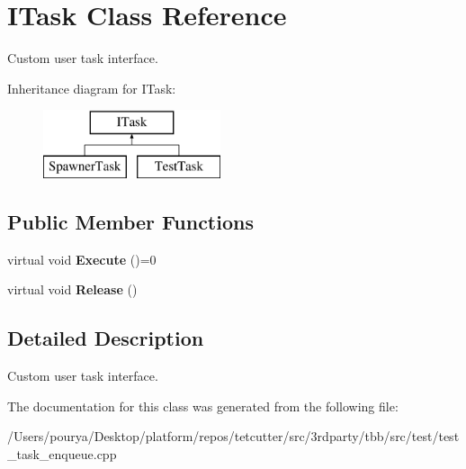 \hypertarget{classITask}{}\section{I\+Task Class Reference}
\label{classITask}


Custom user task interface.  


Inheritance diagram for I\+Task\+:\begin{figure}[H]
\begin{center}
\leavevmode
\includegraphics[height=2.000000cm]{classITask}
\end{center}
\end{figure}
\subsection*{Public Member Functions}
\begin{DoxyCompactItemize}
\item 
\hypertarget{classITask_acfeb6e5e2b09c96904e855215547afc4}{}virtual void {\bfseries Execute} ()=0\label{classITask_acfeb6e5e2b09c96904e855215547afc4}

\item 
\hypertarget{classITask_a623cbf8769786c67b5003c2a869abb0a}{}virtual void {\bfseries Release} ()\label{classITask_a623cbf8769786c67b5003c2a869abb0a}

\end{DoxyCompactItemize}


\subsection{Detailed Description}
Custom user task interface. 

The documentation for this class was generated from the following file\+:\begin{DoxyCompactItemize}
\item 
/\+Users/pourya/\+Desktop/platform/repos/tetcutter/src/3rdparty/tbb/src/test/test\+\_\+task\+\_\+enqueue.\+cpp\end{DoxyCompactItemize}
